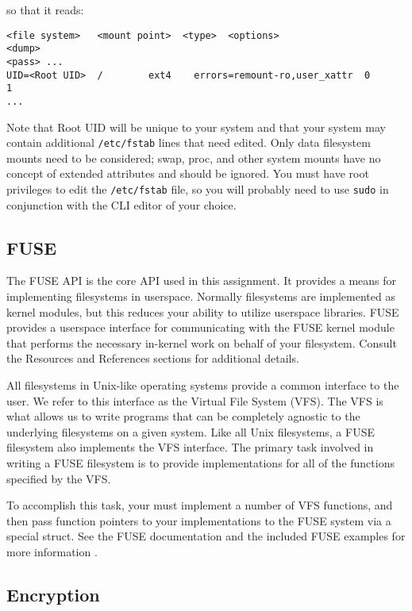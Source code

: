\documentclass[12pt]{article}
\begin{document}
so that it reads:

\begin{verbatim}
<file system>   <mount point>  <type>  <options>                     <dump> 
<pass> ...
UID=<Root UID>  /        ext4    errors=remount-ro,user_xattr  0       1
...
\end{verbatim}

Note that Root UID will be unique to your system and that your
system may contain additional \texttt{/etc/fstab} lines that need
edited. Only data filesystem mounts need to be considered; swap, proc, and
other system mounts have no concept of extended attributes and should
be ignored. You must have root privileges to edit the
\texttt{/etc/fstab} file, so you will probably need to use
\texttt{sudo} in conjunction with the CLI editor of your choice.

\subsection{FUSE}

The FUSE API\cite{fuse-refs} is the core API used in this
assignment. It provides a means for implementing filesystems in
userspace. Normally filesystems are implemented as kernel modules, but
this reduces your ability to utilize userspace libraries. FUSE
provides a userspace interface for communicating with the FUSE kernel
module that performs the necessary in-kernel work on behalf of your
filesystem. Consult the Resources and References sections for additional
details.

All filesystems in Unix-like operating systems provide a common
interface to the user. We refer to this interface as the Virtual File
System (VFS)\cite{linux-vfs}. The VFS is what allows us to write
programs that can be completely agnostic to the underlying filesystems
on a given system. Like all Unix filesystems, a FUSE filesystem also
implements the VFS interface. The primary task involved in writing a
FUSE filesystem is to provide implementations for all of the functions
specified by the VFS.

To accomplish this task, your must implement a number of VFS functions,
and then pass function pointers to your implementations to the FUSE
system via a special struct. See the FUSE documentation and the included
FUSE examples for more information
\cite{fuse-website,fuse-refs,fuse-wiki,pfeiffer-fuse}.

\subsection{Encryption}
\end{document}
